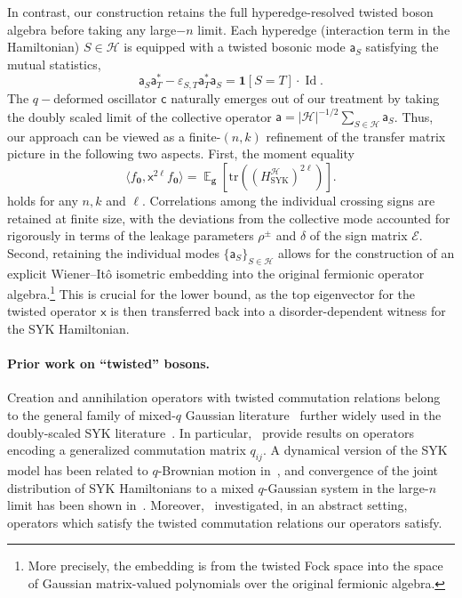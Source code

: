 \documentclass
[11pt,letterpaper]
{article}
\theoremstyle{definition}
\newcommand{\sfc}{\mathsf c}
\newcommand{\sfa}{\mathsf a}
\newcommand{\sfx}{\mathsf x}
\newcommand{\eps}{\varepsilon}
\newcommand{\cE}{{\mathcal E}}
\newcommand{\1}{\mathbf{1}}
\newcommand{\tr}{\mathrm{tr}}
\newcommand{\cH}{\mathcal H}
\newcommand{\Id}{\operatorname{Id}}
\DeclareMathOperator*{\E}{\mathbb{E}}
\begin{document}
In contrast, our construction retains the full hyperedge-resolved twisted boson algebra before taking any large$-n$ limit. Each hyperedge (interaction term in the Hamiltonian) $S\in \cH$ is equipped with a twisted bosonic mode $\sfa_S$ satisfying the mutual statistics, 
\[
\sfa_S\sfa_T^*
-
\eps_{S,T}\sfa_T^*\sfa_S
=
\1[S=T]\cdot\Id.
\]
The $q-$deformed oscillator $\sfc$ naturally emerges out of our treatment by taking the doubly scaled limit of the collective operator $\sfa=|\cH|^{-1/2} \sum_{S\in\cH} \sfa_S$. Thus, our approach can be viewed as a finite-$(n,k)$
refinement of the transfer matrix picture in the following two aspects. First, the moment equality 
\[
    \langle f_{\bm 0}, \sfx^{2\ell} f_{\bm 0}\rangle = \E_{\bm g}\left[\tr\left(\left(H^\cH_{\operatorname{SYK}}\right)^{2\ell}\right)\right].
\]
holds for any $n,k$ and $\ell$. Correlations among the individual crossing signs are retained at finite size, with the deviations from the collective mode accounted for rigorously in terms of the leakage parameters $\rho^{\pm}$ and $\delta$ of the sign matrix $\cE$.
Second, retaining the individual modes $\{\sfa_S\}_{S\in\cH}$ allows for the construction of an explicit Wiener--It\^o isometric embedding into the original fermionic
operator algebra.\footnote{More precisely, the embedding is from the twisted Fock space into the space
of Gaussian matrix-valued polynomials over the original fermionic algebra.} This is crucial for the lower bound, as the top eigenvector for the twisted operator $\sfx$ is then transferred back into a disorder-dependent witness for the SYK Hamiltonian.

\paragraph{Prior work on ``twisted'' bosons.} Creation and annihilation operators with twisted commutation relations belong to the general family of mixed-$q$ Gaussian literature~\cite{bozejko1991example,frisch1970parastochastics,bozejko1997q,junge2015ultraproduct} further widely used in the doubly-scaled SYK literature~\cite{SYK_Berkooz1,SYK_Berkooz2,SYK_Berkooz3,SYK_Garcia1,SYK_Garcia2,SYK_Garcia3,SYK_Jia}. In particular,~\cite{junge2015ultraproduct,microscopicq_bozejko1994,microscopicq_speicher} provide results on operators encoding a generalized commutation matrix $q_{ij}$. A dynamical version of the SYK model has been related to $q$-Brownian motion in~\cite{pluma2022dynamical}, and convergence of the joint distribution of SYK Hamiltonians to a mixed $q$-Gaussian system in the large-$n$ limit has been shown in~\cite{liu2026limit}. Moreover,~\cite{DoresicMM94,MeljanacMP94,MeljanacM96} investigated, in an abstract setting, operators which satisfy the twisted commutation relations our operators satisfy. 
\end{document}
